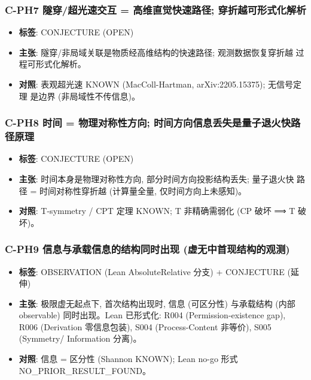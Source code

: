 \documentclass[
]{article}
\providecommand{\tightlist}{%
  \setlength{\itemsep}{0pt}\setlength{\parskip}{0pt}}
\begin{document}
\subsubsection{C-PH7 隧穿/超光速交互 = 高维直觉快速路径;
穿折越可形式化解析}\label{c-ph7-ux96a7ux7a7fux8d85ux5149ux901fux4ea4ux4e92-ux9ad8ux7ef4ux76f4ux89c9ux5febux901fux8defux5f84-ux7a7fux6298ux8d8aux53efux5f62ux5f0fux5316ux89e3ux6790}

\begin{itemize}
\tightlist
\item
  \textbf{标签}: CONJECTURE (OPEN)
\item
  \textbf{主张}: 隧穿/非局域关联是物质经高维结构的快速路径;
  观测数据恢复穿折越 过程可形式化解析。
\item
  \textbf{对照}: 表观超光速 KNOWN (MacColl-Hartman, arXiv:2205.15375);
  无信号定理 是边界 (非局域性不传信息)。
\end{itemize}

\subsubsection{C-PH8 时间 = 物理对称性方向;
时间方向信息丢失是量子退火快路径原理}\label{c-ph8-ux65f6ux95f4-ux7269ux7406ux5bf9ux79f0ux6027ux65b9ux5411-ux65f6ux95f4ux65b9ux5411ux4fe1ux606fux4e22ux5931ux662fux91cfux5b50ux9000ux706bux5febux8defux5f84ux539fux7406}

\begin{itemize}
\tightlist
\item
  \textbf{标签}: CONJECTURE (OPEN)
\item
  \textbf{主张}: 时间本身是物理对称性方向, 部分时间方向投影结构丢失;
  量子退火快 路径 = 时间对称性穿折越 (计算量全量, 仅时间方向上未感知)。
\item
  \textbf{对照}: T-symmetry / CPT 定理 KNOWN; T 非精确需弱化 (CP 破坏 ⟹
  T 破坏)。
\end{itemize}

\subsubsection{C-PH9 信息与承载信息的结构同时出现
(虚无中首现结构的观测)}\label{c-ph9-ux4fe1ux606fux4e0eux627fux8f7dux4fe1ux606fux7684ux7ed3ux6784ux540cux65f6ux51faux73b0-ux865aux65e0ux4e2dux9996ux73b0ux7ed3ux6784ux7684ux89c2ux6d4b}

\begin{itemize}
\tightlist
\item
  \textbf{标签}: OBSERVATION (Lean AbsoluteRelative 分支) + CONJECTURE
  (延伸)
\item
  \textbf{主张}: 极限虚无起点下, 首次结构出现时, 信息 (可区分性)
  与承载结构 (内部 observable) 同时出现。Lean 已形式化: R004
  (Permission-existence gap), R006 (Derivation 零信息包装), S004
  (Process-Content 非等价), S005 (Symmetry/ Information 分离)。
\item
  \textbf{对照}: 信息 = 区分性 (Shannon KNOWN); Lean no-go 形式
  NO\_PRIOR\_RESULT\_FOUND。
\end{itemize}
\end{document}
